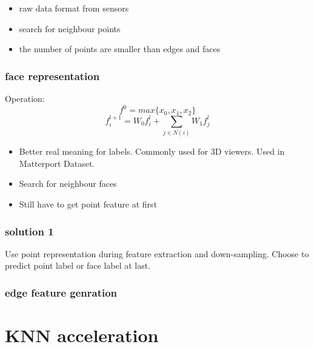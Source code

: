 \documentclass[,table,dvipsnames]{article}
\begin{document}
\begin{itemize}
	\item raw data format from sensors
	\item search for neighbour points
	\item the number of points are smaller than edges and faces
\end{itemize}

\subsubsection{face representation}
Operation:
$$f^0 = max\{x_0, x_1, x_2\}$$
$$f_i^{l+1} = W_0f_i^l + \sum_{j\in N(i)}W_1 f_j^l$$
\par \noindent

\begin{itemize}
	\item Better real meaning for labels. Commonly used for 3D viewers. Used in Matterport Dataset.
	\item Search for neighbour faces
	\item Still have to get point feature at first
\end{itemize}

\subsubsection{solution 1}
Use point representation during feature extraction and down-sampling. Choose to predict point label or face label at last. 

\subsubsection{edge feature genration}



\section{KNN acceleration}
\end{document}
